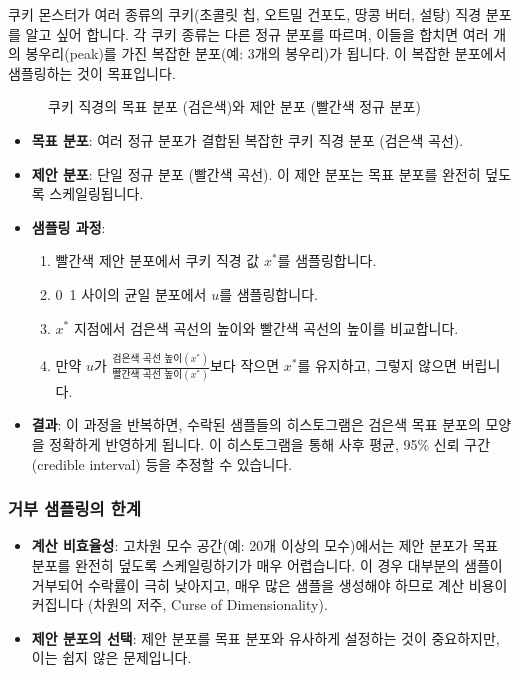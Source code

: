 \documentclass[11pt,a4paper]{article}
\theoremstyle{definition}
\begin{document}
\begin{examplebox}[title=쿠키 몬스터 예시: 다봉형 분포 샘플링]
쿠키 몬스터가 여러 종류의 쿠키(초콜릿 칩, 오트밀 건포도, 땅콩 버터, 설탕) 직경 분포를 알고 싶어 합니다. 각 쿠키 종류는 다른 정규 분포를 따르며, 이들을 합치면 여러 개의 봉우리(peak)를 가진 복잡한 분포(예: 3개의 봉우리)가 됩니다. 이 복잡한 분포에서 샘플링하는 것이 목표입니다.

\begin{figure}[h!]
    \centering
    \caption{쿠키 직경의 목표 분포 (검은색)와 제안 분포 (빨간색 정규 분포)}
    \label{fig:cookie_monster_pdf}
\end{figure}

\begin{itemize}
    \item \textbf{목표 분포}: 여러 정규 분포가 결합된 복잡한 쿠키 직경 분포 (검은색 곡선).
    \item \textbf{제안 분포}: 단일 정규 분포 (빨간색 곡선). 이 제안 분포는 목표 분포를 완전히 덮도록 스케일링됩니다.
    \item \textbf{샘플링 과정}:
    \begin{enumerate}
        \item 빨간색 제안 분포에서 쿠키 직경 값 $x^*$를 샘플링합니다.
        \item 0~1 사이의 균일 분포에서 $u$를 샘플링합니다.
        \item $x^*$ 지점에서 검은색 곡선의 높이와 빨간색 곡선의 높이를 비교합니다.
        \item 만약 $u$가 $\frac{\text{검은색 곡선 높이}(x^*)}{\text{빨간색 곡선 높이}(x^*)}$보다 작으면 $x^*$를 유지하고, 그렇지 않으면 버립니다.
    \end{enumerate}
    \item \textbf{결과}: 이 과정을 반복하면, 수락된 샘플들의 히스토그램은 검은색 목표 분포의 모양을 정확하게 반영하게 됩니다. 이 히스토그램을 통해 사후 평균, 95\% 신뢰 구간(credible interval) 등을 추정할 수 있습니다.
\end{itemize}
\end{examplebox}

\subsubsection*{거부 샘플링의 한계}
\begin{itemize}
    \item \textbf{계산 비효율성}: 고차원 모수 공간(예: 20개 이상의 모수)에서는 제안 분포가 목표 분포를 완전히 덮도록 스케일링하기가 매우 어렵습니다. 이 경우 대부분의 샘플이 거부되어 수락률이 극히 낮아지고, 매우 많은 샘플을 생성해야 하므로 계산 비용이 커집니다 (차원의 저주, Curse of Dimensionality).
    \item \textbf{제안 분포의 선택}: 제안 분포를 목표 분포와 유사하게 설정하는 것이 중요하지만, 이는 쉽지 않은 문제입니다.
\end{itemize}
\end{document}
